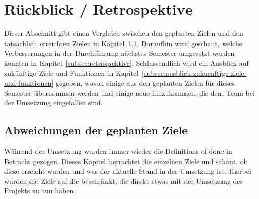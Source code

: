 \section{Rückblick / Retrospektive}\label{sec:rueckblick-retrospektive}

Dieser Abschnitt gibt einen Vergleich zwischen den geplanten Zielen und den tatsächlich erreichten Zielen in Kapitel~\ref{subsec:abweichungen-der-geplanten-ziele}.
Daraufhin wird geschaut, welche Verbesserungen in der Durchführung nächstes Semester umgesetzt werden könnten in Kapitel~\ref{subsec:retrospektive}.
Schlussendlich wird ein Ausblick auf zukünftige Ziele und Funktionen in Kapitel~\ref{subsec:ausblick-zukuenftige-ziele-und-funktionen} gegeben, wovon einige aus den geplanten Zielen für dieses Semester übernommen werden und einige neue hinzukommen, die dem Team bei der Umsetzung eingefallen sind.

\subsection{Abweichungen der geplanten Ziele}\label{subsec:abweichungen-der-geplanten-ziele}
Während der Umsetzung wurden immer wieder die Definitions of done in Betracht gezogen.
Dieses Kapitel betrachtet die einzelnen Ziele und schaut, ob diese erreicht wurden und was der aktuelle Stand in der Umsetzung ist.
Hierbei wurden die Ziele auf die beschränkt, die direkt etwas mit der Umsetzung des Projekts zu tun haben.

